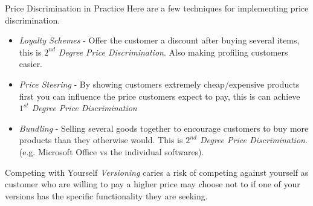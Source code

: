 \documentclass[11pt,a4paper]{article}
\begin{document}
  \begin{proposition}{Price Discrimination in Practice}
    Here are a few techniques for implementing price discrimination.
    \begin{itemize}
      \item \textit{Loyalty Schemes} - Offer the customer a discount after buying several items, this is \textit{$2^{nd}$ Degree Price Discrimination}. Also making profiling customers easier.
      \item \textit{Price Steering} - By showing customers extremely cheap/expensive products first you can influence the price customers expect to pay, this is can achieve \textit{$1^{st}$ Degree Price Discrimination}
      \item \textit{Bundling} - Selling several goods together to encourage customers to buy more products than they otherwise would. This is \textit{$2^{nd}$ Degree Price Discrimination}. (e.g. Microsoft Office vs the individual softwares).
    \end{itemize}
  \end{proposition}

  \begin{remark}{Competing with Yourself}
    \textit{Versioning} caries a risk of competing against yourself as customer who are willing to pay a higher price may choose not to if one of your versions has the specific functionality they are seeking.
  \end{remark}
\end{document}
